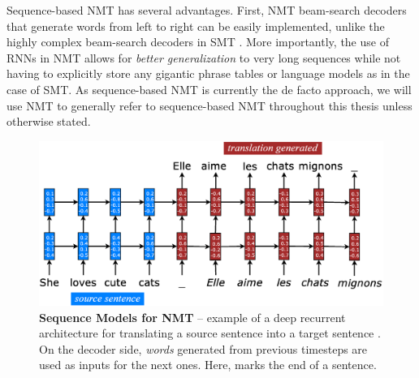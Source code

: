 Sequence-based NMT has several advantages.
First, NMT beam-search decoders that generate words from left to right can be
easily implemented, unlike the highly complex beam-search decoders in SMT
\cite{Koehn:2003:SMT}. More importantly, the use of
RNNs in NMT allows for {\it better generalization} to very long
sequences while not having to  explicitly store any gigantic
phrase tables or language models as in the case of SMT.
As sequence-based NMT is currently the de facto approach, we will use NMT to
generally refer to sequence-based NMT
throughout this thesis unless otherwise stated.

\begin{figure}[tbh!]
\centering
\includegraphics[width=\textwidth, clip=true, trim= 0 0 0
0]{img/nmt_intro}
\caption[Sequence Models for NMT]{{\bf Sequence Models for NMT} -- example of a
deep recurrent architecture for translating a source sentence  into a target sentence . On the
decoder side, {\it words} generated from previous timesteps are used as inputs for the
next ones. Here, \word{\texttt{\_}} marks the end of a sentence.
} 
\label{f:nmt}
\end{figure}

